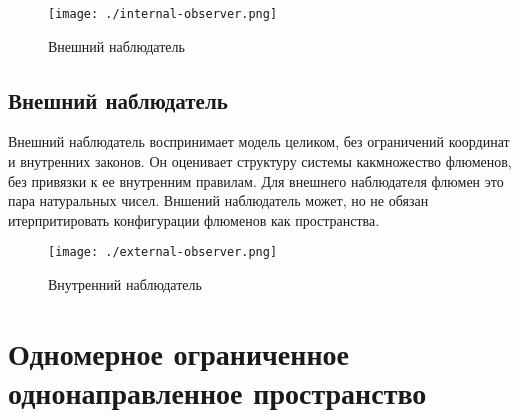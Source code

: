 \documentclass[final]{article}
\begin{document}
            \begin{figure}[H]
                \centering
                \texttt{[image: ./internal-observer.png]}
                \caption{Внешний наблюдатель}
                \label{fig:image}
            \end{figure}

        \subsection{Внешний наблюдатель}

            Внешний наблюдатель воспринимает модель целиком, без ограничений 
            координат и внутренних законов. Он оценивает структуру системы 
            какмножество флюменов, без привязки к ее внутренним правилам. Для 
            внешнего наблюдателя флюмен это пара натуральных чисел. Вншений 
            наблюдатель может, но не обязан итерпритировать конфигурации флюменов 
            как пространства.

            \begin{figure}[H]
                \centering
                \texttt{[image: ./external-observer.png]}
                \caption{Внутренний наблюдатель}
                \label{fig:image}
            \end{figure}

    \section{Одномерное ограниченное однонаправленное пространство}
\end{document}

